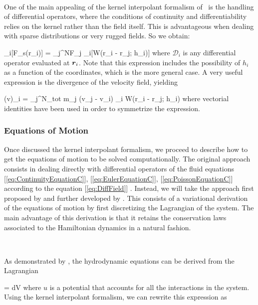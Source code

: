 \documentclass[a4,useAMS,usenatbib,usegraphicx,12pt]{article}
\begin{document}
\

One of the main appealing of the kernel interpolant formalism of \SPH\ is the
handling of differential operators, where the conditions of continuity and 
differentiability relies on the kernel rather than the field itself. This is 
advantageous when dealing with sparse distributions or very rugged fields. So
we obtain:

{ _i[F_s(\bds r_i)] = \sum_j^{N}F_j 
_i[W(\bds r_i - \bds r_j; h_i)] }
where $\mathcal{D}_i$ is any differential operator evaluated at $\boldsymbol{ r }_i$. Note
that this expression includes the possibility of $h_i$ as a function of the 
coordinates, which is the more general case. A very useful expression is the 
divergence of the velocity field, yielding

{ (\nabla \cdot \bds v)_i = \sum_j^{N_{tot}} m_j (\bds v_j - \bds v_i)
\cdot \nabla_i W(\bds r_i - \bds r_j; h_i) }
where vectorial identities have been used in order to symmetrize the expression.

\subsubsection*{Equations of Motion}

Once discussed the kernel interpolant formalism, we proceed to describe how to
get the equations of motion to be solved computationally. The original approach
consists in dealing directly with differential operators of the fluid equations 
[\ref{eq:ContinuityEquationC}], [\ref{eq:EulerEquationC}], 
[\ref{eq:PoissonEquationC}] according to the equation [\ref{eq:DiffField}] 
\citep{Lucy77,Gingold77}. Instead, we will take the approach first proposed by 
\citet{Gingold82} and further developed by \citet{Springel11}. This consists of 
a variational derivation of the equations of motion by first discretizing the 
Lagrangian of the system. The main advantage of this derivation is that it 
retains the conservation laws associated to the Hamiltonian dynamics in a 
natural fashion.

\

As demonstrated by \citet{Eckart60}, the hydrodynamic equations can be derived
from the Lagrangian

{  = \int \rho {}dV }
where $u$ is a potential that accounts for all the interactions in the system. 
Using the kernel interpolant formalism, we can rewrite this expression as
\end{document}

